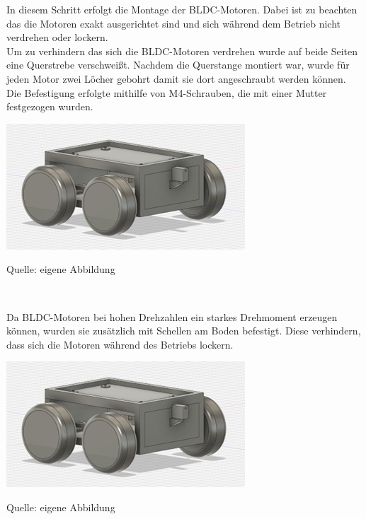 \documentclass[ngerman,12pt,a4paper]{article}
\begin{document}
	In diesem Schritt erfolgt die Montage der BLDC-Motoren. Dabei ist zu beachten das die Motoren exakt ausgerichtet sind und sich während dem Betrieb nicht verdrehen oder lockern.\\[2cm]
	Um zu verhindern das sich die BLDC-Motoren verdrehen wurde auf beide Seiten eine Querstrebe verschweißt. Nachdem die Querstange montiert war, wurde für jeden Motor zwei Löcher gebohrt damit sie dort angeschraubt werden können. Die Befestigung erfolgte mithilfe von M4-Schrauben, die mit einer Mutter festgezogen wurden.
	
	\begin{center} 
		\begin{minipage}[t]{0.6\textwidth}
			\includegraphics{Pictures/modell-fertig}
			\label{fig:modell-fertig}
			\vspace{-10pt}
			\begin{center}
				\par\small Quelle: eigene Abbildung 
			\end{center}
		\end{minipage} \\[0.75cm]
	\end{center} 
	Da BLDC-Motoren bei hohen Drehzahlen ein starkes Drehmoment erzeugen können, wurden sie zusätzlich mit Schellen am Boden befestigt. Diese verhindern, dass sich die Motoren während des Betriebs lockern.
	
		\begin{center} 
		\begin{minipage}[t]{0.6\textwidth}
			\includegraphics{Pictures/modell-fertig}
			\label{fig:modell-fertig}
			\vspace{-10pt}
			\begin{center}
				\par\small Quelle: eigene Abbildung 
			\end{center}
		\end{minipage} \\[0.75cm]
	\end{center} 
	
\end{document}
